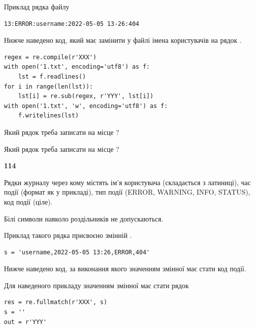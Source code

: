 Приклад рядка файлу



\begin{verbatim}
13:ERROR:username:2022-05-05 13-26:404
\end{verbatim}


Нижче наведено код, який має замінити у файлі імена користувачів на рядок .



\begin{verbatim}
regex = re.compile(r'XXX')
with open('1.txt', encoding='utf8') as f:
    lst = f.readlines()
for i in range(len(lst)):
    lst[i] = re.sub(regex, r'YYY', lst[i])
with open('1.txt', 'w', encoding='utf8') as f:
    f.writelines(lst)
\end{verbatim}







Який рядок треба записати на місце  ?\par
\vspace{5mm}


Який рядок треба записати на місце  ?\par


\newpage

{\begin {center}\textbf{ 114}\end {center}}\par
Рядки журналу через кому містять ім'я користувача (складається з латиниці), час події (фор\-мат як у прикладі), тип події (ERROR, WARNING, INFO, STATUS), код події (ціле).

Білі символи навколо роздільників не допускаються.

Приклад такого рядка присвоєно змінній .



\begin{verbatim}
s = 'username,2022-05-05 13:26,ERROR,404'
\end{verbatim}


Нижче наведено код, за виконання якого значенням змінної  має стати код події.

Для наведеного прикладу значенням змінної  має стати рядок 



\begin{verbatim}
res = re.fullmatch(r'XXX', s)
s = ''
out = r'YYY'
\end{verbatim}


